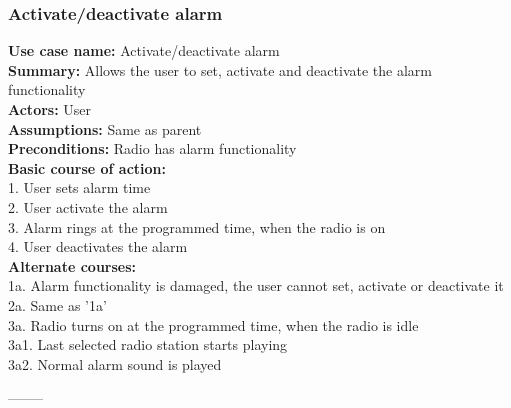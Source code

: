 \documentclass[11pt]{article}
\begin{document}
\subsubsection{Activate/deactivate alarm}
\textbf{Use case name:} Activate/deactivate alarm\\
\textbf{Summary:} Allows the user to set, activate and deactivate the alarm functionality\\
\textbf{Actors:} User\\
\textbf{Assumptions:} Same as parent\\
\textbf{Preconditions:} Radio has alarm functionality\\
\textbf{Basic course of action:}\\
\hspace*{10mm}1. User sets alarm time\\
\hspace*{10mm}2. User activate the alarm\\
\hspace*{10mm}3. Alarm rings at the programmed time, when the radio is on\\
\hspace*{10mm}4. User deactivates the alarm\\
\textbf{Alternate courses:}\\
\hspace*{10mm}1a. Alarm functionality is damaged, the user cannot set, activate or deactivate it\\
\hspace*{10mm}2a. Same as '1a'\\
\hspace*{10mm}3a. Radio turns on at the programmed time, when the radio is idle\\
\hspace*{20mm}3a1. Last selected radio station starts playing\\
\hspace*{20mm}3a2. Normal alarm sound is played
\begin{center}--------\end{center}
\end{document}
